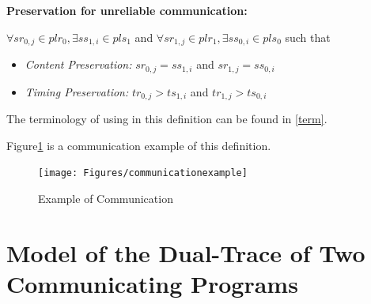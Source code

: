 \textbf{Preservation for unreliable communication:}

$\forall sr_{0,j} \in plr_{0}, \exists ss_{1,i} \in pls_{1}$ and $\forall sr_{1,j} \in plr_{1}, \exists ss_{0,i} \in pls_{0}$ such that
\begin{itemize}
 \item \textit{ Content Preservation:}  $sr_{0,j} = ss_{1,i}$ and $sr_{1,j} = ss_{0,i}$ 
 \item \textit{Timing Preservation:}    $tr_{0,j} > ts_{1,i}$ and $tr_{1,j} > ts_{0,i}$
\end{itemize}
The terminology of using in this definition can be found in \ref{term}.



Figure\ref{communicationhappen} is a communication example of this definition. 
\begin{figure}[H]
\centerline{\texttt{[image: Figures/communicationexample]}}
 \caption{Example of Communication}
\label{communicationhappen}
\end{figure}


\section{Model of the Dual-Trace of Two Communicating Programs}




